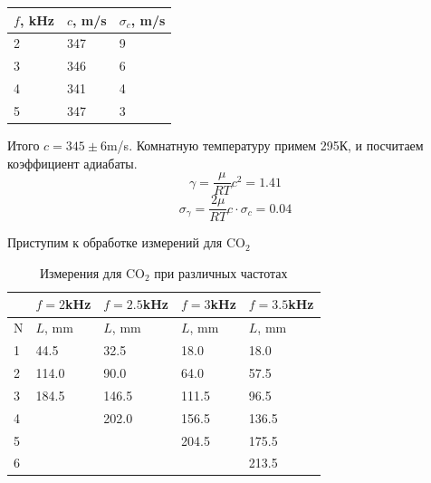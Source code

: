 \documentclass[12pt]{article}
\begin{document}
\begin{table}[H]
	\centering
	\begin{tabular}{|l|l|l|}
		\hline
		$f$, kHz & $c$, m/s & $\sigma_c$, m/s \\ \hline
		2        & 347      & 9               \\ \hline
		3        & 346      & 6               \\ \hline
		4        & 341      & 4               \\ \hline
		5        & 347      & 3               \\ \hline
	\end{tabular}
\end{table}

Итого $c = 345 \pm 6$m/s. Комнатную температуру примем 295К, и посчитаем коэффициент адиабаты.
\begin{equation*}
	\gamma = \frac{\mu}{RT}c^2 = 1.41
\end{equation*}
\begin{equation*}
\sigma_\gamma = \frac{2\mu}{RT}c\cdot\sigma_c = 0.04
\end{equation*}

Приступим к обработке измерений для CO$_2$
\begin{table}[H]
	\centering
	\caption{Измерения для CO$_2$ при различных частотах}
	\begin{tabular}{|l|l|l|l|l|}
		\hline
		& $f = 2$kHz & $f = 2.5$kHz & $f = 3$kHz & $f = 3.5$kHz \\ \hline
		N & $L$, mm    & $L$, mm      & $L$, mm    & $L$, mm      \\ \hline
		1 & 44.5       & 32.5         & 18.0       & 18.0         \\ \hline
		2 & 114.0      & 90.0         & 64.0       & 57.5         \\ \hline
		3 & 184.5      & 146.5        & 111.5      & 96.5         \\ \hline
		4 &            & 202.0        & 156.5      & 136.5        \\ \hline
		5 &            &              & 204.5      & 175.5        \\ \hline
		6 &            &              &            & 213.5        \\ \hline
	\end{tabular}
\end{table}
\end{document}
